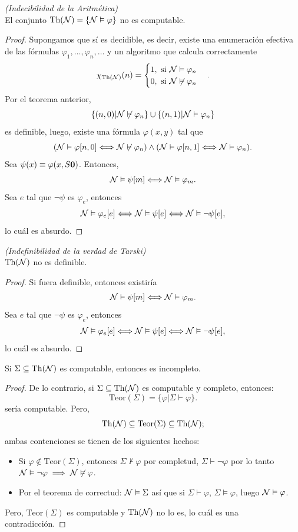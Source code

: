 \begin{thm} \textit{(Indecibilidad de la Aritmética)}\\
    El conjunto $\text{Th}(\mathcal{N})=\{\mathcal{N}\vDash\varphi\}$ no es computable.
\end{thm}
\begin{proof}
    Supongamos que sí es decidible, es decir, existe una enumeración efectiva de las fórmulas $\varphi_1,\ldots,\varphi_n,\ldots$ y un algoritmo que calcula correctamente 
    \[\chi_{\text{Th}(\mathcal{N})}(n)=\begin{cases}
        1,\text{ si }\mathcal{N}\vDash\varphi_n\\
        0,\text{ si }\mathcal{N}\not\vDash\varphi_n
    \end{cases}.\]
    Por el teorema anterior,
    \[\{(n,0)|\mathcal{N}\not\vDash\varphi_n\}\cup\{(n,1)|\mathcal{N}\vDash\varphi_n\}\]
    es definible, luego, existe una fórmula $\varphi(x,y)$ tal que
    \[(\mathcal{N}\vDash\varphi[n,0]\Longleftrightarrow\mathcal{N}\not\vDash\varphi_n)\land(\mathcal{N}\vDash\varphi[n,1]\Longleftrightarrow \mathcal{N}\vDash\varphi_n).\]
    Sea $\psi(x)\equiv\varphi(x,S\mathbf{0})$. Entonces,
    \[\mathcal{N}\vDash\psi[m]\Longleftrightarrow\mathcal{N}\vDash\varphi_m.\]
    Sea $e$ tal que $\neg\psi$ es $\varphi_e$, entonces 
    \[\mathcal{N}\vDash\varphi_e[e]\Longleftrightarrow\mathcal{N}\vDash\psi[e]\Longleftrightarrow\mathcal{N}\vDash\neg\psi[e],\]
    lo cuál es absurdo.
\end{proof}
\begin{thm} \textit{(Indefinibilidad de la verdad de Tarski)}\\
    $\text{Th}(\mathcal{N})$ no es definible.
\end{thm}
\begin{proof}
    Si fuera definible, entonces existiría
    \[\mathcal{N}\vDash\psi[m]\Longleftrightarrow\mathcal{N}\vDash\varphi_m.\]
    Sea $e$ tal que $\neg\psi$ es $\varphi_e$, entonces
    \[\mathcal{N}\vDash\varphi_e[e]\Longleftrightarrow\mathcal{N}\vDash\psi[e]\Longleftrightarrow\mathcal{N}\vDash\neg\psi[e],\]
    lo cuál es absurdo.
\end{proof}
\begin{cor}
    Si $\Sigma\subseteq \text{Th}(\mathcal{N})$ es computable, entonces es incompleto.
\end{cor}
\begin{proof}
    De lo contrario, si $\Sigma\subseteq \text{Th}(\mathcal{N})$ es computable y completo, entonces:
    \[\text{Teor}(\Sigma)=\{\varphi|\Sigma\vdash\varphi\}.\]
    sería computable. Pero,
    \[\text{Th}(\mathcal{N})\subseteq\text{Teor}(\Sigma)\subseteq\text{Th}(\mathcal{N});\]
    ambas contenciones se tienen de los siguientes hechos:
    \begin{itemize}
        \item Si $\varphi\not\in\text{Teor}(\Sigma)$, entonces $\Sigma\not\vdash\varphi$ por completud, $\Sigma\vdash\neg\varphi$ por lo tanto $\mathcal{N}\vDash\neg\varphi\implies\mathcal{N}\not\vDash\varphi$.
        \item Por el teorema de correctud: $\mathcal{N}\vDash\Sigma$ así que si $\Sigma\vdash\varphi$, $\Sigma\vDash\varphi$, luego $\mathcal{N}\vDash\varphi$.
    \end{itemize}
    Pero, $\text{Teor}(\Sigma)$ es computable y $\text{Th}(\mathcal{N})$ no lo es, lo cuál es una contradicción.
\end{proof}

